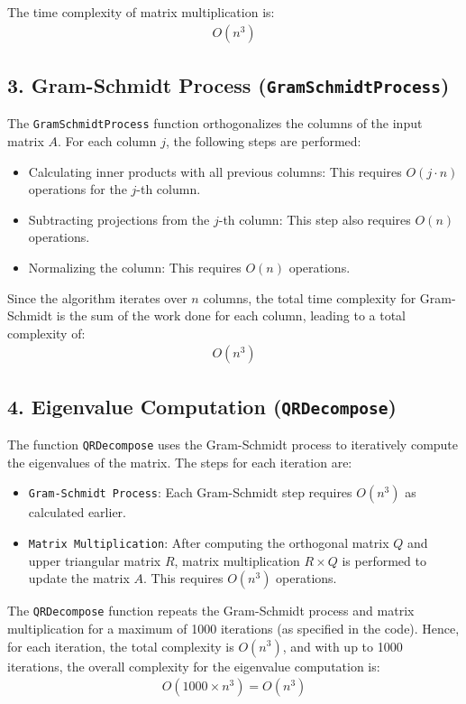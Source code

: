 \documentclass[article]{IEEEtran}
\numberwithin{equation}{enumi}
\numberwithin{figure}{enumi}
\begin{document}
The time complexity of matrix multiplication is:
\begin{align*}
O(n^3)
\end{align*}

\subsection*{3. Gram-Schmidt Process (\texttt{GramSchmidtProcess})}
The \texttt{GramSchmidtProcess} function orthogonalizes the columns of the input matrix $A$. For each column $j$, the following steps are performed:

\begin{itemize}
    \item Calculating inner products with all previous columns: This requires $O(j \cdot n)$ operations for the $j$-th column.
    \item Subtracting projections from the $j$-th column: This step also requires $O(n)$ operations.
    \item Normalizing the column: This requires $O(n)$ operations.
\end{itemize}

Since the algorithm iterates over $n$ columns, the total time complexity for Gram-Schmidt is the sum of the work done for each column, leading to a total complexity of:
\begin{align*}
O(n^3)
\end{align*}

\subsection*{4. Eigenvalue Computation (\texttt{QRDecompose})}
The function \texttt{QRDecompose} uses the Gram-Schmidt process to iteratively compute the eigenvalues of the matrix. The steps for each iteration are:

\begin{itemize}
    \item \texttt{Gram-Schmidt Process}: Each Gram-Schmidt step requires $O(n^3)$ as calculated earlier.
    \item \texttt{Matrix Multiplication}: After computing the orthogonal matrix $Q$ and upper triangular matrix $R$, matrix multiplication $R \times Q$ is performed to update the matrix $A$. This requires $O(n^3)$ operations.
\end{itemize}

The \texttt{QRDecompose} function repeats the Gram-Schmidt process and matrix multiplication for a maximum of 1000 iterations (as specified in the code). Hence, for each iteration, the total complexity is $O(n^3)$, and with up to 1000 iterations, the overall complexity for the eigenvalue computation is:
\begin{align*}
O(1000 \times n^3) = O(n^3)
\end{align*}
\end{document}
